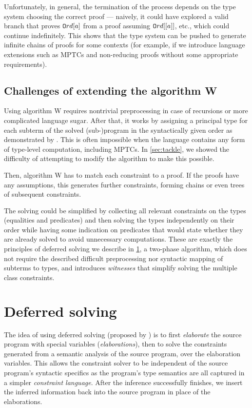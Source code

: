 Unfortunately, in general, the termination of the process depends on the type system choosing the correct proof --- naively, it could have explored a valid branch that proves $\mathtt{O}rd [a]$ from a proof assuming $\mathtt{O}rd [[a]]$, etc., which could continue indefinitely. This shows that the type system can be pushed to generate infinite chains of proofs for some contexts (for example, if we introduce language extensions such as MPTCs and non-reducing proofs without some appropriate requirements).

\subsection{Challenges of extending the algorithm W}


Using algorithm W requires nontrivial preprocessing in case of recursions or more complicated language sugar. After that, it works by assigning a principal type for each subterm of the solved (sub-)program in the syntactically given order as demonstrated by \citet{jones1999typing}. This is often impossible when the language contains any form of type-level computation, including MPTCs. In \cref{sec:tackle}, we showed the difficulty of attempting to modify the algorithm to make this possible.

Then, algorithm W has to match each constraint to a proof. If the proofs have any assumptions, this generates further constraints, forming chains or even trees of subsequent constraints.

The solving could be simplified by collecting all relevant constraints on the types (equalities and predicates) and then solving the types independently on their order while having some indication on predicates that would state whether they are already solved to avoid unnecessary computations. These are exactly the principles of deferred solving we describe in \cref{defer_solve}, a two-phase algorithm, which does not require the described difficult preprocessing nor syntactic mapping of subterms to types, and introduces \emph{witnesses} that simplify solving the multiple class constraints.

\section{Deferred solving}
\label{defer_solve}

The idea of using deferred solving (proposed by \citet{vytiniotis2011outsidein}) is to first \emph{elaborate} the source program with special variables (\emph{elaborations}), then to solve the constraints generated from a semantic analysis of the source program, over the elaboration variables. This allows the constraint solver to be independent of the source program's syntactic specifics as the program's type semantics are all captured in a simpler \emph{constraint language}. After the inference successfully finishes, we insert the inferred information back into the source program in place of the elaborations.

